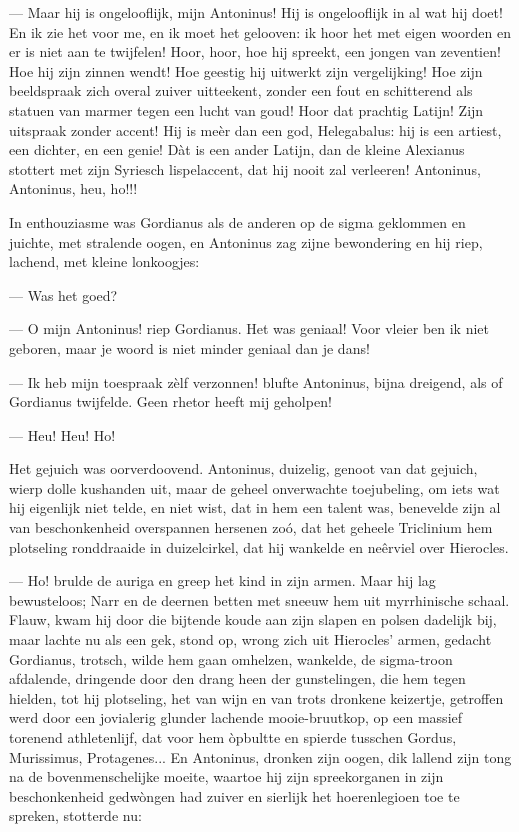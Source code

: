 \documentclass[a4paper, 12pt, oneside, dutch]{article}
\begin{document}
--- Maar hij is ongelooflijk, mijn Antoninus! Hij is ongelooflijk in al wat hij doet! En ik zie het voor me, en ik moet het gelooven: ik hoor het met eigen woorden en er is niet aan te twijfelen! Hoor, hoor, hoe hij spreekt, een jongen van zeventien! Hoe hij zijn zinnen wendt! Hoe geestig hij uitwerkt zijn vergelijking! Hoe zijn beeldspraak zich overal zuiver uitteekent, zonder een fout en schitterend als statuen van marmer tegen een lucht van goud! Hoor dat prachtig Latijn! Zijn uitspraak zonder accent! Hij is meèr dan een god, Helegabalus: hij is een artiest, een dichter, en een genie! Dàt is een ander Latijn, dan de kleine Alexianus stottert met zijn Syriesch lispelaccent, dat hij nooit zal verleeren! Antoninus, Antoninus, heu, ho!!!

In enthouziasme was Gordianus als de anderen op de sigma geklommen en juichte, met stralende oogen, en Antoninus zag zijne bewondering en hij riep, lachend, met kleine lonkoogjes:

--- Was het goed?

--- O mijn Antoninus! riep Gordianus. Het was geniaal! Voor vleier ben ik niet geboren, maar je woord is niet minder geniaal dan je dans!

--- Ik heb mijn toespraak zèlf verzonnen! blufte Antoninus, bijna dreigend, als of Gordianus twijfelde. Geen rhetor heeft mij geholpen!

--- Heu! Heu! Ho!

Het gejuich was oorverdoovend. Antoninus, duizelig, genoot van dat gejuich, wierp dolle kushanden uit, maar de geheel onverwachte toejubeling, om iets wat hij eigenlijk niet telde, en niet wist, dat in hem een talent was, benevelde zijn al van beschonkenheid overspannen hersenen zoó, dat het geheele Triclinium hem plotseling ronddraaide in duizelcirkel, dat hij wankelde en neêrviel over Hierocles.

--- Ho! brulde de auriga en greep het kind in zijn armen. Maar hij lag bewusteloos; Narr en de deernen betten met sneeuw hem uit myrrhinische schaal. Flauw, kwam hij door die bijtende koude aan zijn slapen en polsen dadelijk bij, maar lachte nu als een gek, stond op, wrong zich uit Hierocles' armen, gedacht Gordianus, trotsch, wilde hem gaan omhelzen, wankelde, de sigma-troon afdalende, dringende door den drang heen der gunstelingen, die hem tegen hielden, tot hij plotseling, het van wijn en van trots dronkene keizertje, getroffen werd door een jovialerig glunder lachende mooie-bruutkop, op een massief torenend athletenlijf, dat voor hem òpbultte en spierde tusschen Gordus, Murissimus, Protagenes... En Antoninus, dronken zijn oogen, dik lallend zijn tong na de bovenmenschelijke moeite, waartoe hij zijn spreekorganen in zijn beschonkenheid gedwòngen had zuiver en sierlijk het hoerenlegioen toe te spreken, stotterde nu:
\end{document}
